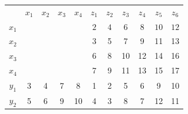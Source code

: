 \begin{hide}
\begin{table}[]
\centering
\begin{tabular}{ccccccccccc}
                           & $x_1$                   & $x_2$                   & $x_3$                   & $x_4$                   & $z_1$                    & $z_2$                    & $z_3$                    & $z_4$                    & $z_5$                     & $z_6$                     \\ \cline{6-11} 
$x_1$                      &                         &                         &                         & \multicolumn{1}{c|}{}   & \multicolumn{1}{c|}{$2$} & \multicolumn{1}{c|}{$4$} & \multicolumn{1}{c|}{$6$} & \multicolumn{1}{c|}{$8$} & \multicolumn{1}{c|}{$10$} & \multicolumn{1}{c|}{$12$} \\ \cline{6-11} 
$x_2$                      &                         &                         &                         & \multicolumn{1}{c|}{}   & \multicolumn{1}{c|}{3}   & \multicolumn{1}{c|}{5}   & \multicolumn{1}{c|}{7}   & \multicolumn{1}{c|}{9}   & \multicolumn{1}{c|}{11}   & \multicolumn{1}{c|}{13}   \\ \cline{6-11} 
$x_3$                      &                         &                         &                         & \multicolumn{1}{c|}{}   & \multicolumn{1}{c|}{6}   & \multicolumn{1}{c|}{8}   & \multicolumn{1}{c|}{10}  & \multicolumn{1}{c|}{12}  & \multicolumn{1}{c|}{14}   & \multicolumn{1}{c|}{16}   \\ \cline{6-11} 
$x_4$                      &                         &                         &                         & \multicolumn{1}{c|}{}   & \multicolumn{1}{c|}{7}   & \multicolumn{1}{c|}{9}   & \multicolumn{1}{c|}{11}  & \multicolumn{1}{c|}{13}  & \multicolumn{1}{c|}{15}   & \multicolumn{1}{c|}{17}   \\ \cline{2-11} 
\multicolumn{1}{c|}{$y_1$} & \multicolumn{1}{c|}{3}  & \multicolumn{1}{c|}{4}  & \multicolumn{1}{c|}{7}  & \multicolumn{1}{c|}{8}  & \multicolumn{1}{c|}{1}   & \multicolumn{1}{c|}{2}   & \multicolumn{1}{c|}{5}   & \multicolumn{1}{c|}{6}   & \multicolumn{1}{c|}{9}    & \multicolumn{1}{c|}{10}   \\ \cline{2-11} 
\multicolumn{1}{c|}{$y_2$} & \multicolumn{1}{c|}{5}  & \multicolumn{1}{c|}{6}  & \multicolumn{1}{c|}{9}  & \multicolumn{1}{c|}{10} & \multicolumn{1}{c|}{4}   & \multicolumn{1}{c|}{3}   & \multicolumn{1}{c|}{8}   & \multicolumn{1}{c|}{7}   & \multicolumn{1}{c|}{12}   & \multicolumn{1}{c|}{11}   \\ \cline{2-11} 

\end{tabular}
\end{table}
\end{hide}
